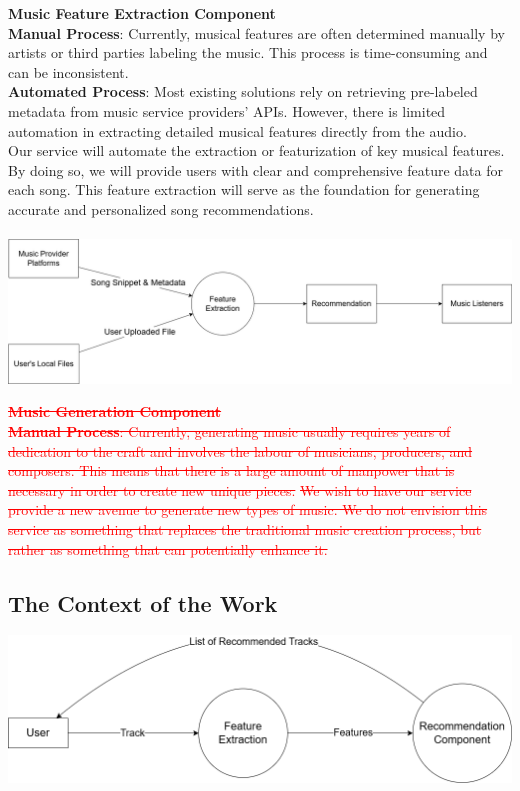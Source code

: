\documentclass[12pt]{article}
\begin{document}
\noindent\textbf{Music Feature Extraction Component}
\\\textbf{Manual Process}: Currently, musical features are often determined manually by artists or third parties 
labeling the music. This process is time-consuming and can be inconsistent. 
\\\textbf{Automated Process}: Most existing solutions rely on retrieving pre-labeled metadata from music service providers’ APIs.
  However, there is limited automation in extracting detailed musical features directly from the audio. 
\\Our service will automate the extraction or featurization of key musical features. By doing so, we will provide users with clear 
and comprehensive feature data for each song. This feature extraction will serve as the foundation for generating accurate and personalized song recommendations.\\ 
\\\includegraphics[width=\textwidth]{6_1b2.png}


\textcolor{red}{\sout{\textbf{Music Generation Component}}}
\\\textcolor{red}{\sout{\textbf{Manual Process}: Currently, generating music usually requires years of dedication to the craft and involves the
labour of musicians, producers, and composers. This means that there is a large amount of manpower that is necessary
in order to create new unique pieces. }}
\textcolor{red}{\sout{We wish to have our service provide a new avenue to generate new types of music. We do not envision this service as 
something that replaces the traditional music creation process, but rather as something that can potentially enhance it. }}


\subsection{The Context of the Work}
\vspace{2em}
\includegraphics[width=\textwidth]{6_2context.png}
\end{document}
